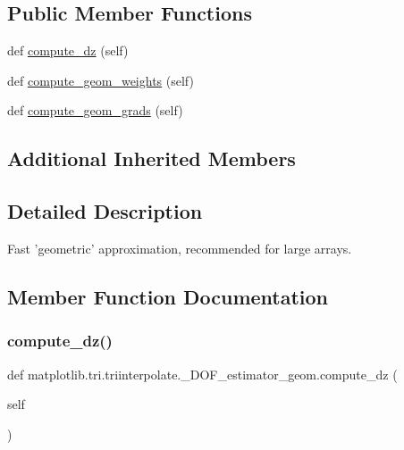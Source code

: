 \subsection*{Public Member Functions}
\begin{DoxyCompactItemize}
\item 
def \hyperlink{classmatplotlib_1_1tri_1_1triinterpolate_1_1__DOF__estimator__geom_affbd1a1763ce76316a123fb9f15f6cdb}{compute\+\_\+dz} (self)
\item 
def \hyperlink{classmatplotlib_1_1tri_1_1triinterpolate_1_1__DOF__estimator__geom_a16ec5b0c62ead2e5c291a8285ebdbf64}{compute\+\_\+geom\+\_\+weights} (self)
\item 
def \hyperlink{classmatplotlib_1_1tri_1_1triinterpolate_1_1__DOF__estimator__geom_a3b459fb71ceda04299deddac8f6283c4}{compute\+\_\+geom\+\_\+grads} (self)
\end{DoxyCompactItemize}
\subsection*{Additional Inherited Members}


\subsection{Detailed Description}
\begin{DoxyVerb}Fast 'geometric' approximation, recommended for large arrays.\end{DoxyVerb}
 

\subsection{Member Function Documentation}
\mbox{\label{classmatplotlib_1_1tri_1_1triinterpolate_1_1__DOF__estimator__geom_affbd1a1763ce76316a123fb9f15f6cdb}} 
\subsubsection{\texorpdfstring{compute\+\_\+dz()}{compute\_dz()}}
{\footnotesize\ttfamily def matplotlib.\+tri.\+triinterpolate.\+\_\+\+D\+O\+F\+\_\+estimator\+\_\+geom.\+compute\+\_\+dz (\begin{DoxyParamCaption}\item[{}]{self }\end{DoxyParamCaption})}

